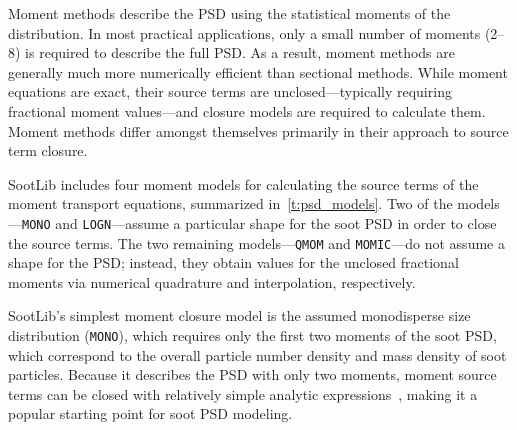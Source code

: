 \documentclass[preprint,letterpaper]{elsarticle}
\begin{document}
Moment methods describe the PSD using the statistical moments of the distribution.
In most practical applications, only a small number of moments (2--8) is required to describe the full PSD. As a result, moment methods are generally much more numerically efficient than sectional methods.
While moment equations are exact, their source terms are unclosed---typically requiring fractional moment values---and closure models are required to calculate them. Moment methods differ amongst themselves primarily in their approach to source term closure.

SootLib includes four moment models for calculating the source terms of the moment transport equations, summarized in~\ref{t:psd_models}. Two of the models---\texttt{MONO} and \texttt{LOGN}---assume a particular shape for the soot PSD in order to close the source terms. The two remaining models---\texttt{QMOM} and \texttt{MOMIC}---do not assume a shape for the PSD; instead, they obtain values for the unclosed fractional moments via numerical quadrature and interpolation, respectively.

SootLib's simplest moment closure model is the assumed monodisperse size distribution (\texttt{MONO}), which requires only the first two moments of the soot PSD, which correspond to the overall particle number density and mass density of soot particles. Because it describes the PSD with only two moments, moment source terms can be closed with relatively simple analytic expressions~\cite{Lignell_2008b}, making it a popular starting point for soot PSD modeling.
\end{document}

